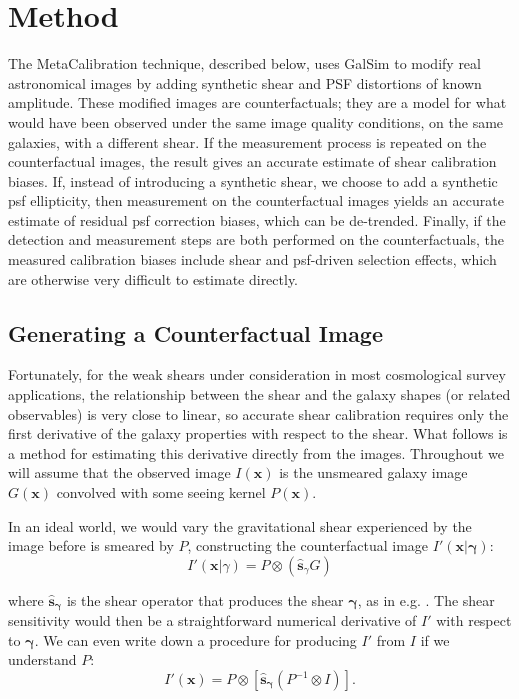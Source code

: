 \documentclass[iop]{emulateapj}
\begin{document}
\section{Method}
The MetaCalibration technique, described below, uses GalSim
\citep{2015A&C....10..121R} to modify real astronomical images by
adding synthetic shear and PSF distortions of known amplitude. These
modified images are counterfactuals; they are a model for what would
have been observed under the same image quality conditions, on the
same galaxies, with a different shear. If the measurement process is
repeated on the counterfactual images, the result gives an accurate
estimate of shear calibration biases. If, instead of introducing a
synthetic shear, we choose to add a synthetic psf ellipticity, then
measurement on the counterfactual images yields an accurate estimate
of residual psf correction biases, which can be de-trended.  Finally,
if the detection and measurement steps are both performed on the
counterfactuals, the measured calibration biases include shear and
psf-driven selection effects, which are otherwise very difficult to
estimate directly.

\subsection{Generating a Counterfactual Image}
Fortunately, for the weak shears under consideration in most
cosmological survey applications, the relationship between the shear
and the galaxy shapes (or related observables) is very close to
linear, so accurate shear calibration requires only the first
derivative of the galaxy properties with respect to the shear. What
follows is a method for estimating this derivative directly from the
images. Throughout we will assume that the observed image
$I({\mathbf{x}})$ is the unsmeared galaxy image $G(\mathbf{x})$
convolved with some seeing kernel $P(\mathbf{x})$.

In an ideal world, we would vary the gravitational shear experienced
by the image before is smeared by $P$, constructing the counterfactual
image $I'(\mathbf{x}| {\boldsymbol \gamma})$:
\begin{equation}
  I'({\mathbf{x}}|\gamma) = P \otimes\left( \hat{\mathbf{s}}_{\gamma}G\right)
\end{equation}

where $\hat{\mathbf{s}}_{\boldsymbol \gamma}$ is the shear operator that produces the shear
${\boldsymbol \gamma}$, as in e.g. \cite{2002AJ....123..583B}. The
shear sensitivity would then be a straightforward numerical derivative
of $I'$ with respect to ${\boldsymbol \gamma}$. We can even write down
a procedure for producing $I'$ from $I$ if we understand $P$:
\begin{equation}
  I'({\mathbf{x}}) = P \otimes \left[\hat{\mathbf{s}}_{\boldsymbol \gamma}\left( P^{-1} \otimes I \right)\right].
\end{equation}
\end{document}
